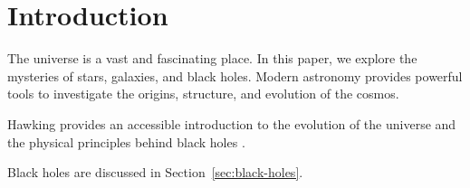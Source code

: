 \section{Introduction}
The universe is a vast and fascinating place. In this paper, we explore the mysteries of stars, galaxies, and black holes. Modern astronomy provides powerful tools to investigate the origins, structure, and evolution of the cosmos.

Hawking provides an accessible introduction to the evolution of the universe and the physical principles behind black holes \parencite{hawking1988}.

Black holes are discussed in Section~\ref{sec:black-holes}.